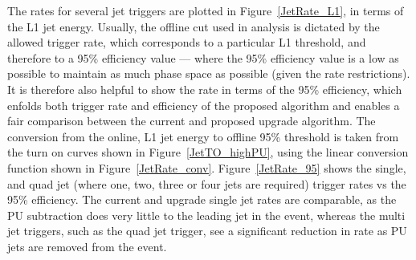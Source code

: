 The rates for several jet triggers are plotted in Figure~\ref{JetRate_L1}, in terms of the \ac{L1} jet energy.
%
Usually, the offline cut used in analysis is dictated by the allowed trigger rate, which corresponds to a particular \ac{L1} threshold, and therefore to a 95\% efficiency value --- where the 95\% efficiency value is a low as possible to maintain as much phase space as possible (given the rate restrictions).
It is therefore also helpful to show the rate in terms of the 95\% efficiency, which enfolds both trigger rate and efficiency of the proposed algorithm and enables a fair comparison between the current and proposed upgrade algorithm.
The conversion from the online, \ac{L1} jet energy to offline 95\% threshold is taken from the turn on curves shown in Figure~\ref{JetTO_highPU}, using the linear conversion function shown in Figure~\ref{JetRate_conv}.
Figure~\ref{JetRate_95} shows the single,  and quad jet (where one, two, three or four jets are required) trigger rates vs the 95\% efficiency. 
The current and upgrade single jet rates are comparable, as the PU subtraction does very little to the leading jet in the event, whereas the multi jet triggers, such as the quad jet trigger, see a significant reduction in rate as PU jets are removed from the event.     

